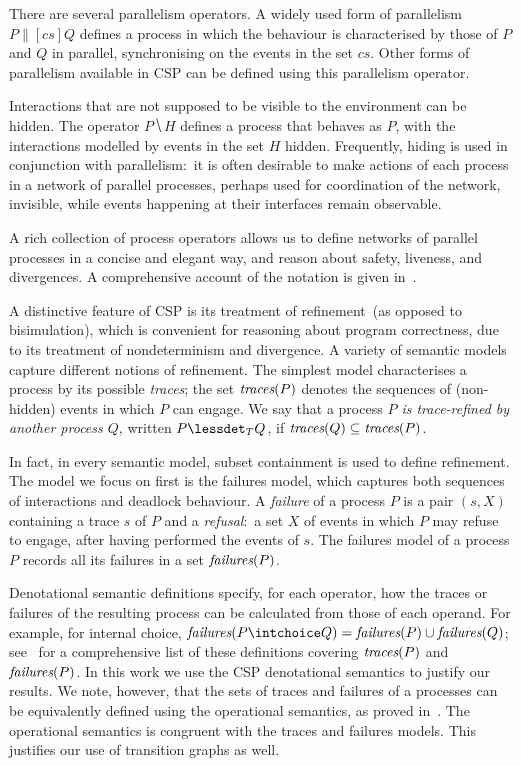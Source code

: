 \documentclass[3p,times]{elsarticle}
\newcommand{\trc}{\text{\it traces}}
\newcommand{\fails}{\text{\it failures}}
\begin{document}
There are several parallelism operators. A widely used form of parallelism $P
\parallel[cs] Q$ defines a process in which the behaviour is characterised by
those of $P$ and $Q$ in parallel, synchronising on the events in the set
$cs$. Other forms of parallelism available in CSP can be defined using this
parallelism operator.

Interactions that are not supposed to be visible to the environment can be
hidden. The operator $P \hide H$ defines a process that behaves as $P$, with
the interactions modelled by events in the set $H$ hidden. Frequently, hiding
is used in conjunction with parallelism:~it is often desirable to make
actions of each process in a network of parallel processes, perhaps used for
coordination of the network, invisible, while events happening at their
interfaces remain observable.

A rich collection of process operators allows us to define networks of
parallel processes in a concise and elegant way, and reason about safety,
liveness, and divergences.  A comprehensive account of the notation is given
in~\cite{Roscoe2010}.

A distinctive feature of CSP is its treatment of refinement~(as opposed to
bisimulation), which is convenient for reasoning about program correctness,
due to its treatment of nondeterminism and divergence.  A variety of semantic
models capture different notions of refinement. The simplest model
characterises a process by its possible \emph{traces}; the set $\trc(P)$
denotes the sequences of (non-hidden) events in which $P$ can engage.  We say
that a process \emph{$P$ is trace-refined by another process $Q$}, written $P
\lessdet_T Q$, if $\trc(Q)\subseteq \trc(P)$.

In fact, in every semantic model, subset containment is used to define refinement. The
model we focus on first is the failures model, which captures both
sequences of interactions and deadlock behaviour. A \emph{failure} of a process $P$
is a pair $(s,X)$ containing a trace $s$ of $P$ and a \emph{refusal}:~a set $X$ of
events in which $P$ may refuse to engage, after having performed the events of
$s$. The failures model of a process $P$ records all its failures in a set
$\fails(P)$.

Denotational semantic definitions specify, for each operator, how the traces
or failures of the resulting process can be calculated from those of each
operand. For example, for internal choice, $\fails(P\intchoice Q) =
\fails(P)\cup\fails(Q)$; see~\cite[p.~210]{Roscoe:1997:TPC:550448} for a
comprehensive list of these definitions covering $\trc(P)$ and $\fails(P)$.
In this work we use the CSP denotational semantics to justify our results. We
note, however, that the sets of traces and failures of a processes can be
equivalently defined using the operational semantics, as proved
in~\cite{Roscoe2010}. The operational semantics is congruent with the traces
and failures models. This justifies our use of transition graphs as well.
\end{document}
